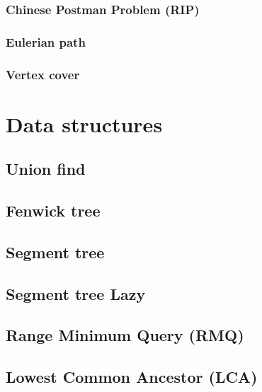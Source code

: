 \documentclass[a4paper]{article}
\begin{document}
\begin{multicols*}{2}
        \subsubsection{Chinese Postman Problem (RIP)}
            
        \subsubsection{Eulerian path}
            
        \subsubsection{Vertex cover}
            

\section{Data structures}
    \subsection{Union find}
        
    \subsection{Fenwick tree}
        
    \subsection{Segment tree}
        
    \subsection{Segment tree Lazy}
        
    \subsection{Range Minimum Query (RMQ)}
        
    \subsection{Lowest Common Ancestor (LCA)}
        

\end{multicols*}
\end{document}
